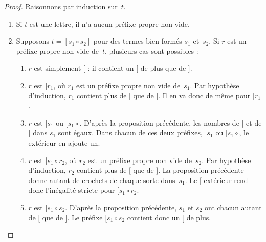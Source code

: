 \documentclass[../../../include/open-logic-section]{subfiles}
\begin{document}
\begin{proof}
Raisonnons par
induction sur~$t$.
\begin{enumerate}
\item Si $t$
  est une lettre,
  il n'a aucun
  préfixe propre
  non vide.
\item Supposons
  $t=[s_1 \circ s_2]$
  pour des termes
  bien formés
  $s_1$ et~$s_2$.
  Si $r$ est
  un préfixe
  propre non vide
  de~$t$,
  plusieurs cas
  sont possibles :
  \begin{enumerate}
  \item $r$ est
    simplement $[$ :
    il contient
    un $[$ de
    plus que
    de $]$.
  \item $r$ est
    $[r_1$, où
    $r_1$ est
    un préfixe
    propre non
    vide de~$s_1$.
    Par hypothèse
    d'induction,
    $r_1$ contient
    plus de $[$
    que de $]$.
    Il en va
    donc de même
    pour $[r_1$.
  \item $r$ est
    $[s_1$ ou
    $[s_1 \circ {}$.
    D'après la
    proposition
    précédente,
    les nombres
    de $[$ et
    de $]$ dans
    $s_1$ sont
    égaux. Dans
    chacun de ces
    deux préfixes,
    $[s_1$ ou
    $[s_1 \circ {}$,
    le $[$ extérieur
    en ajoute un.
  \item $r$ est
    $[s_1 \circ r_2$,
    où $r_2$ est
    un préfixe
    propre non
    vide de~$s_2$.
    Par hypothèse
    d'induction,
    $r_2$ contient
    plus de $[$
    que de $]$.
    La proposition
    précédente donne
    autant de
    crochets de
    chaque sorte
    dans~$s_1$.
    Le $[$ extérieur
    rend donc
    l'inégalité
    stricte pour
    $[s_1 \circ r_2$.
  \item $r$ est
    $[s_1 \circ s_2$.
    D'après la
    proposition
    précédente,
    $s_1$ et
    $s_2$ ont
    chacun autant
    de $[$ que
    de $]$.
    Le préfixe
    $[s_1 \circ s_2$
    contient donc
    un $[$ de plus.
  \end{enumerate}
\end{enumerate}
\end{proof}
\end{document}
